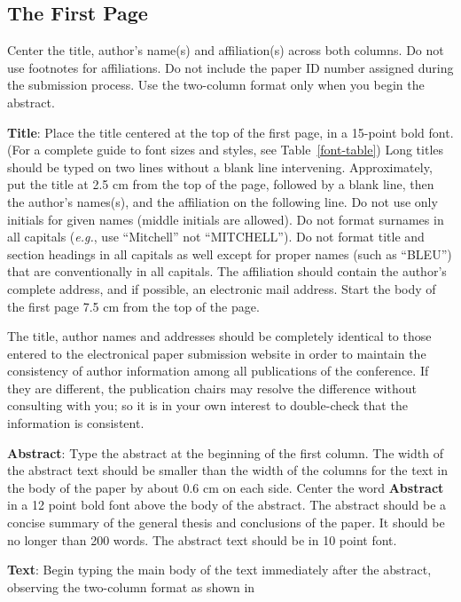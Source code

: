 \subsection{The First Page}
\label{ssec:first}

Center the title, author's name(s) and affiliation(s) across both
columns. Do not use footnotes for affiliations. Do not include the
paper ID number assigned during the submission process. Use the
two-column format only when you begin the abstract.

{\bf Title}: Place the title centered at the top of the first page, in
a 15-point bold font. (For a complete guide to font sizes and styles,
see Table~\ref{font-table}) Long titles should be typed on two lines
without a blank line intervening. Approximately, put the title at 2.5
cm from the top of the page, followed by a blank line, then the
author's names(s), and the affiliation on the following line. Do not
use only initials for given names (middle initials are allowed). Do
not format surnames in all capitals ({\em e.g.}, use ``Mitchell'' not
``MITCHELL'').  Do not format title and section headings in all
capitals as well except for proper names (such as ``BLEU'') that are
conventionally in all capitals.  The affiliation should contain the
author's complete address, and if possible, an electronic mail
address. Start the body of the first page 7.5 cm from the top of the
page.

The title, author names and addresses should be completely identical
to those entered to the electronical paper submission website in order
to maintain the consistency of author information among all
publications of the conference. If they are different, the publication
chairs may resolve the difference without consulting with you; so it
is in your own interest to double-check that the information is
consistent.

{\bf Abstract}: Type the abstract at the beginning of the first
column. The width of the abstract text should be smaller than the
width of the columns for the text in the body of the paper by about
0.6 cm on each side. Center the word {\bf Abstract} in a 12 point bold
font above the body of the abstract. The abstract should be a concise
summary of the general thesis and conclusions of the paper. It should
be no longer than 200 words. The abstract text should be in 10 point font.

{\bf Text}: Begin typing the main body of the text immediately after
the abstract, observing the two-column format as shown in 


